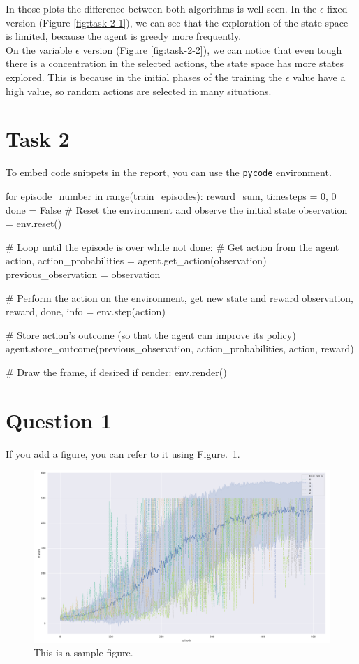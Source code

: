 \documentclass[12pt]{article}
\begin{document}
In those plots the difference between both algorithms is well seen. In the $\epsilon$-fixed version (Figure \ref{fig:task-2-1}), we can see that the exploration of the state space is limited, because the agent is greedy more frequently.\\

On the variable $\epsilon$ version (Figure \ref{fig:task-2-2}), we can notice that even tough there is a concentration in the selected actions, the state space has more states explored. This is because in the initial phases of the training the $\epsilon$ value have a high value, so random actions are selected in many situations.

\section{Task 2}
To embed code snippets in the report, you can use the \texttt{pycode} environment.

\begin{pycode}
for episode_number in range(train_episodes):
    reward_sum, timesteps = 0, 0
    done = False
    # Reset the environment and observe the initial state
    observation = env.reset()

    # Loop until the episode is over
    while not done:
        # Get action from the agent
        action, action_probabilities = agent.get_action(observation)
        previous_observation = observation

        # Perform the action on the environment, get new state and reward
        observation, reward, done, info = env.step(action)

        # Store action's outcome (so that the agent can improve its policy)
        agent.store_outcome(previous_observation, action_probabilities, action, reward)

        # Draw the frame, if desired
        if render:
            env.render()
\end{pycode}

\section{Question 1}

If you add a figure, you can refer to it using Figure.~\ref*{fig:fig1}.

\begin{figure}[h] 
	\centering  %
    \includegraphics[width=0.9\columnwidth]{img/training.pdf}
	\caption{This is a sample figure.}
	\label{fig:fig1}
\end{figure}


\end{document}
